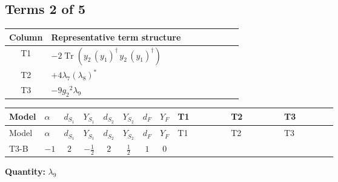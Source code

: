 \documentclass[8pt]{article}
\begin{document}
\begin{landscape}
\subsection*{Terms 2 of 5}
\begin{center}
\begin{tabular}{@{}c >{\raggedright\arraybackslash}p{0.82\linewidth}@{}}
\toprule
Column & Representative term structure \\
\midrule
T1 & \(\displaystyle -2 \operatorname{Tr}\!\left({y_2}\,\left({y_1}\right)^{\dagger}\,{y_2}\,\left({y_1}\right)^{\dagger}\right)\) \\
\midrule
T2 & \(\displaystyle +4 {\lambda_{7}} \left({\lambda_{8}}\right)^{*}\) \\
\midrule
T3 & \(\displaystyle -9 {g_2}^2 {\lambda_{9}}\) \\
\midrule
\bottomrule
\end{tabular}
\end{center}
\smallskip
\tiny
\begin{longtable}{@{}llcccccc >{\raggedright\arraybackslash}p{0.21\linewidth} >{\raggedright\arraybackslash}p{0.21\linewidth} >{\raggedright\arraybackslash}p{0.21\linewidth}@{}}
\toprule
Model & $\alpha$ & $d_{S_1}$ & $Y_{S_1}$ & $d_{S_2}$ & $Y_{S_2}$ & $d_F$ & $Y_F$ & T1 & T2 & T3 \\
\midrule
\endfirsthead
\toprule
Model & $\alpha$ & $d_{S_1}$ & $Y_{S_1}$ & $d_{S_2}$ & $Y_{S_2}$ & $d_F$ & $Y_F$ & T1 & T2 & T3 \\
\midrule
\endhead
T3-B & $-1$ & $2$ & $-\frac{1}{2}$ & $2$ & $\frac{1}{2}$ & $1$ & $0$ & \scriptsize\adjustbox{max width=\linewidth}{$\begin{gathered} -2 \operatorname{Tr}\!\left({y_2}\,\left({y_1}\right)^{\dagger}\,{y_2}\,\left({y_1}\right)^{\dagger}\right)\end{gathered}$} & \scriptsize\adjustbox{max width=\linewidth}{$\begin{gathered} +4 {\lambda_{7}} \left({\lambda_{8}}\right)^{*}\end{gathered}$} & \scriptsize\adjustbox{max width=\linewidth}{$\begin{gathered} -9 {g_2}^2 {\lambda_{9}}\end{gathered}$} \\
\midrule
\bottomrule
\end{longtable}
\clearpage
\noindent\textbf{Quantity: }$\lambda_{9}$\par\smallskip

\end{landscape}
\end{document}
